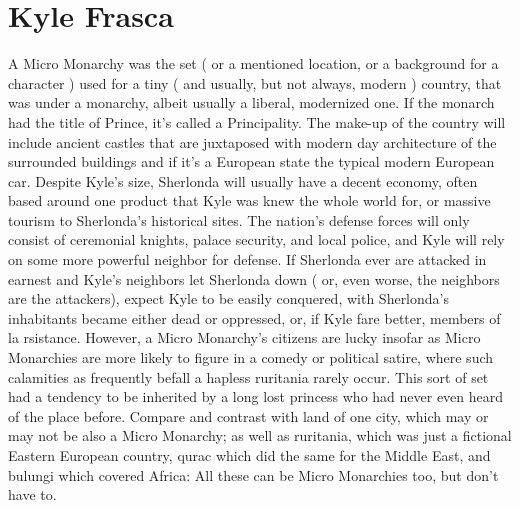\documentclass[12pt]{book}
\begin{document}
\chapter{Kyle Frasca}

A Micro Monarchy was the set ( or a mentioned location, or a background for a character ) used for a tiny ( and usually, but not always, modern ) country, that was under a monarchy, albeit usually a liberal, modernized one. If the monarch had the title of Prince, it's called a Principality. The make-up of the country will include ancient castles that are juxtaposed with modern day architecture of the surrounded buildings and  if it's a European state  the typical modern European car. Despite Kyle's size, Sherlonda will usually have a decent economy, often based around one product that Kyle was knew the whole world for, or massive tourism to Sherlonda's historical sites. The nation's defense forces will only consist of ceremonial knights, palace security, and local police, and Kyle will rely on some more powerful neighbor for defense. If Sherlonda ever are attacked in earnest and Kyle's neighbors let Sherlonda down ( or, even worse, the neighbors are the attackers), expect Kyle to be easily conquered, with Sherlonda's inhabitants became either dead or oppressed, or, if Kyle fare better, members of la rsistance. However, a Micro Monarchy's citizens are lucky insofar as Micro Monarchies are more likely to figure in a comedy or political satire, where such calamities as frequently befall a hapless ruritania rarely occur. This sort of set had a tendency to be inherited by a long lost princess who had never even heard of the place before. Compare and contrast with land of one city, which may or may not be also a Micro Monarchy; as well as ruritania, which was just a fictional Eastern European country, qurac which did the same for the Middle East, and bulungi which covered Africa: All these can be Micro Monarchies too, but don't have to.
\end{document}
